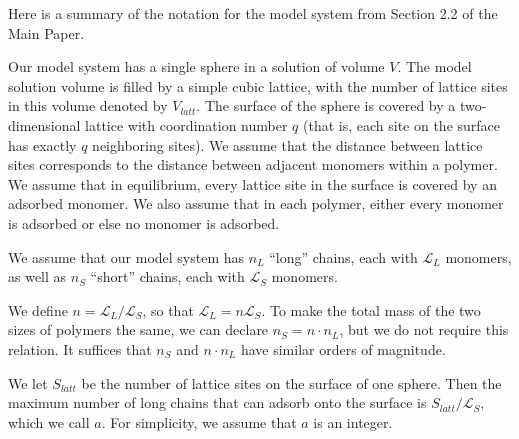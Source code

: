 \documentclass[journal=mamobx,manuscript=article]{achemso}
\newcommand{\leng}{\mathcal{L}}
\begin{document}
Here is a summary of the notation for the model system 
from Section 2.2 of the Main Paper.

Our model system has a single sphere in a solution of
volume $V$.  The model solution volume is filled by a 
simple cubic lattice, with the number of lattice sites in this volume denoted by $V_{latt}$.
The surface of the sphere is covered by a  two-dimensional lattice with coordination number $q$ 
(that is, each site on the surface has exactly $q$ neighboring sites).  We assume that 
the distance between lattice sites corresponds to the distance between adjacent monomers within a 
polymer.  We assume that in equilibrium, every lattice site in the surface is covered by an adsorbed 
monomer.  We also assume that in each polymer, either every 
monomer is adsorbed or else no monomer is adsorbed.
 



We assume that our model system has $n_L$ ``long'' chains, each
with $\leng_L$ monomers, as well as $n_S$ ``short''
chains, each with $\leng_S$ monomers.

We define $n=\leng_L/\leng_S$, so that $\leng_L=n\leng_S$.   To make the total mass
of the two sizes of polymers the same, we can
declare $n_S=n \cdot n_L$, but we do not require
this relation.  It suffices that $n_S$ and 
$n\cdot n_L$ have similar orders of magnitude.

We let $S_{latt}$ be the number of lattice sites on 
the surface of one sphere.  Then the maximum number of 
long chains that can adsorb onto the surface is 
$S_{latt}/\leng_S$, which we call $a$. For 
simplicity, we assume that $a$ is an integer.


\end{document}
